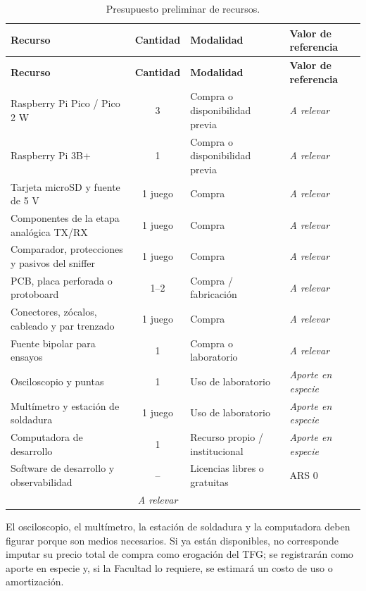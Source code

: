 \documentclass[12pt,a4paper,oneside]{article}
\newcommand{\MontoARelevar}{\textit{A relevar}}
\newcommand{\AporteEnEspecie}{\textit{Aporte en especie}}
\begin{document}
\begin{longtable}{>{\raggedright\arraybackslash}p{5.0cm}c>{\raggedright\arraybackslash}p{3.2cm}>{\raggedleft\arraybackslash}p{2.8cm}}
  \caption{Presupuesto preliminar de recursos.}\label{tab:presupuesto-recursos}\\
  \toprule
  \textbf{Recurso} & \textbf{Cantidad} & \textbf{Modalidad} & \textbf{Valor de referencia} \\
  \midrule
  \endfirsthead
  \toprule
  \textbf{Recurso} & \textbf{Cantidad} & \textbf{Modalidad} & \textbf{Valor de referencia} \\
  \midrule
  \endhead
  Raspberry Pi Pico / Pico 2 W & 3 & Compra o disponibilidad previa & \MontoARelevar \\
  Raspberry Pi 3B+ & 1 & Compra o disponibilidad previa & \MontoARelevar \\
  Tarjeta microSD y fuente de 5 V & 1 juego & Compra & \MontoARelevar \\
  Componentes de la etapa analógica TX/RX & 1 juego & Compra & \MontoARelevar \\
  Comparador, protecciones y pasivos del sniffer & 1 juego & Compra & \MontoARelevar \\
  PCB, placa perforada o protoboard & 1--2 & Compra / fabricación & \MontoARelevar \\
  Conectores, zócalos, cableado y par trenzado & 1 juego & Compra & \MontoARelevar \\
  Fuente bipolar para ensayos & 1 & Compra o laboratorio & \MontoARelevar \\
  Osciloscopio y puntas & 1 & Uso de laboratorio & \AporteEnEspecie \\
  Multímetro y estación de soldadura & 1 juego & Uso de laboratorio & \AporteEnEspecie \\
  Computadora de desarrollo & 1 & Recurso propio / institucional & \AporteEnEspecie \\
  Software de desarrollo y observabilidad & -- & Licencias libres o gratuitas & ARS 0 \\
  \midrule
  \multicolumn{3}{r}{\textbf{Total de erogaciones directas}} & \MontoARelevar \\
  \bottomrule
\end{longtable}

El osciloscopio, el multímetro, la estación de soldadura y la computadora deben figurar porque son medios necesarios. Si ya están disponibles, no corresponde imputar su precio total de compra como erogación del TFG; se registrarán como aporte en especie y, si la Facultad lo requiere, se estimará un costo de uso o amortización.
\end{document}
